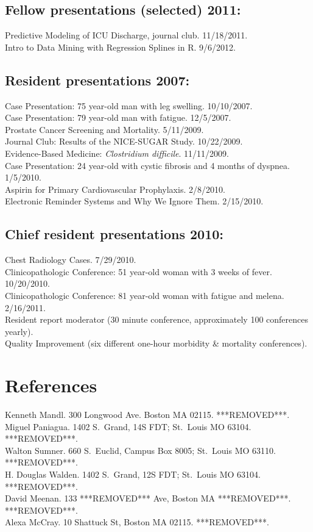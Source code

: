 \documentclass[12pt]{article}
\begin{document}
\subsection*{Fellow presentations (selected) 2011:}
Predictive Modeling of ICU Discharge, journal club. 11/18/2011.\\
Intro to Data Mining with Regression Splines in R. 9/6/2012.

\subsection*{Resident presentations 2007:}
Case Presentation: 75 year-old man with leg swelling. 10/10/2007.\\
Case Presentation: 79 year-old man with fatigue. 12/5/2007.\\
Prostate Cancer Screening and Mortality. 5/11/2009.\\
Journal Club: Results of the NICE-SUGAR Study. 10/22/2009.\\
Evidence-Based Medicine: \emph{Clostridium difficile}. 11/11/2009.\\
Case Presentation: 24 year-old with cystic fibrosis and 4 months of
dyspnea. 1/5/2010.\\
Aspirin for Primary Cardiovascular Prophylaxis. 2/8/2010.\\
Electronic Reminder Systems and Why We Ignore Them. 2/15/2010.

\subsection*{Chief resident presentations 2010:}
Chest Radiology Cases. 7/29/2010.\\
Clinicopathologic Conference: 51 year-old woman with 3 weeks of fever.
10/20/2010.\\
Clinicopathologic Conference: 81 year-old woman with fatigue and
melena. 2/16/2011.\\
Resident report moderator (30 minute conference, approximately 100
conferences yearly).\\
Quality Improvement (six different one-hour morbidity \& mortality
conferences).

\section*{References}
Kenneth Mandl. 300 Longwood Ave. Boston MA 02115. ***REMOVED***.\\
Miguel Paniagua. 1402 S.\ Grand, 14S FDT; St.\ Louis MO 63104.
***REMOVED***.\\
Walton Sumner. 660 S.\ Euclid, Campus Box 8005; St.\ Louis MO 63110.
***REMOVED***.\\
H. Douglas Walden. 1402 S.\ Grand, 12S FDT; St.\ Louis MO 63104.
***REMOVED***.\\
David Meenan. 133 ***REMOVED*** Ave, Boston MA ***REMOVED***. ***REMOVED***.\\
Alexa McCray. 10 Shattuck St, Boston MA 02115. ***REMOVED***.
\end{document}

